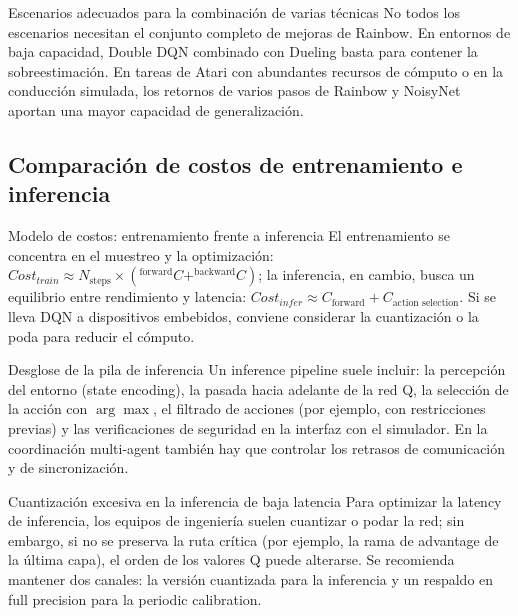 \documentclass[a4paper]{article}
\begin{document}
\begin{knowledgebox}{Escenarios adecuados para la combinación de varias técnicas}
No todos los escenarios necesitan el conjunto completo de mejoras de Rainbow. En entornos de baja capacidad, Double DQN combinado con Dueling basta para contener la sobreestimación. En tareas de Atari con abundantes recursos de cómputo o en la conducción simulada, los retornos de varios pasos de Rainbow y NoisyNet aportan una mayor capacidad de generalización.
\end{knowledgebox}

\subsection{Comparación de costos de entrenamiento e inferencia}

\begin{importantbox}{Modelo de costos: entrenamiento frente a inferencia}
El entrenamiento se concentra en el muestreo y la optimización: $Cost_{train} \approx N_{\text{steps}} \times (^{\text{forward}}C + ^{\text{backward}}C)$; la inferencia, en cambio, busca un equilibrio entre rendimiento y latencia: $Cost_{infer} \approx C_{\text{forward}} + C_{\text{action selection}}$. Si se lleva DQN a dispositivos embebidos, conviene considerar la cuantización o la poda para reducir el cómputo.
\end{importantbox}

\begin{knowledgebox}{Desglose de la pila de inferencia}
Un inference pipeline suele incluir: la percepción del entorno (state encoding), la pasada hacia adelante de la red Q, la selección de la acción con $\arg\max$, el filtrado de acciones (por ejemplo, con restricciones previas) y las verificaciones de seguridad en la interfaz con el simulador. En la coordinación multi-agent también hay que controlar los retrasos de comunicación y de sincronización.
\end{knowledgebox}

\begin{warningbox}{Cuantización excesiva en la inferencia de baja latencia}
Para optimizar la latency de inferencia, los equipos de ingeniería suelen cuantizar o podar la red; sin embargo, si no se preserva la ruta crítica (por ejemplo, la rama de advantage de la última capa), el orden de los valores Q puede alterarse. Se recomienda mantener dos canales: la versión cuantizada para la inferencia y un respaldo en full precision para la periodic calibration.
\end{warningbox}
\end{document}
